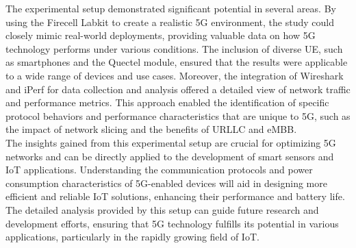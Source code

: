 \documentclass{report}
\begin{document}
The experimental setup demonstrated significant potential in several areas. By using the Firecell Labkit to create a realistic 5G environment, the study could closely mimic real-world deployments, providing valuable data on how 5G technology performs under various conditions. The inclusion of diverse UE, such as smartphones and the Quectel module, ensured that the results were applicable to a wide range of devices and use cases. Moreover, the integration of Wireshark and iPerf for data collection and analysis offered a detailed view of network traffic and performance metrics. This approach enabled the identification of specific protocol behaviors and performance characteristics that are unique to 5G, such as the impact of network slicing and the benefits of URLLC and eMBB.\\
The insights gained from this experimental setup are crucial for optimizing 5G networks and can be directly applied to the development of smart sensors and IoT applications. Understanding the communication protocols and power consumption characteristics of 5G-enabled devices will aid in designing more efficient and reliable IoT solutions, enhancing their performance and battery life. The detailed analysis provided by this setup can guide future research and development efforts, ensuring that 5G technology fulfills its potential in various applications, particularly in the rapidly growing field of IoT.
\end{document}
